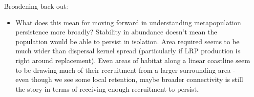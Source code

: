 \documentclass[12pt, oneside]{article}   	%
\begin{document}
\begin{itemize}

\end{itemize}

Broadening back out:
\begin{itemize}
	\item What does this mean for moving forward in understanding metapopulation persistence more broadly? Stability in abundance doesn't mean the population would be able to persist in isolation. Area required seems to be much wider than dispersal kernel spread (particularly if LRP production is right around replacement). Even areas of habitat along a linear coastline seem to be drawing much of their recruitment from a larger surrounding area - even though we see some local retention, maybe broader connectivity is still the story in terms of receiving enough recruitment to persist.
\end{itemize}



\end{document}
